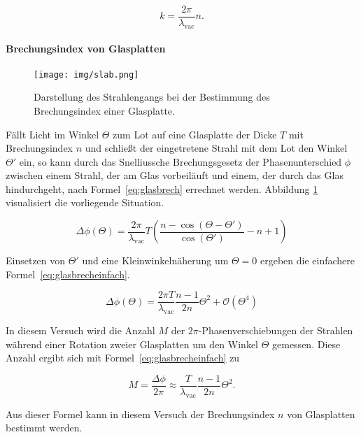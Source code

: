 \begin{equation*}
k = \frac{2\pi}{\lambda_\text{vac}}n.
\end{equation*}

\paragraph{Brechungsindex von Glasplatten}
\begin{figure}
\centering
\texttt{[image: img/slab.png]}
\caption{Darstellung des Strahlengangs bei der Bestimmung des Brechungsindex einer Glasplatte.  \cite{V64}}
\label{fig:slab}
\end{figure}

Fällt Licht im Winkel $\Theta$ zum Lot auf eine Glasplatte der Dicke $T$ mit Brechungsindex $n$ und schließt der eingetretene Strahl mit dem Lot den Winkel $\Theta'$ ein, so kann durch das Snelliussche Brechungsgesetz der Phasenunterschied $\phi$ zwischen einem Strahl, der am Glas vorbeiläuft und einem, der durch das Glas hindurchgeht, nach Formel~\eqref{eq:glasbrech} errechnet werden. Abbildung \ref{fig:slab} visualisiert die vorliegende Situation.

\begin{equation}
\Delta\phi(\Theta) = \frac{2\pi}{\lambda_\text{vac}}T\left(
\frac{n-\cos(\Theta - \Theta')}{\cos(\Theta')} - n+1\right)
\label{eq:glasbrech}
\end{equation}

Einsetzen von $\Theta'$ und eine Kleinwinkelnäherung um $\Theta = 0$ ergeben die einfachere Formel~\eqref{eq:glasbrecheinfach}.

\begin{equation}
\Delta\phi(\Theta) = \frac{2\pi T}{\lambda_\text{vac}}
\frac{n-1}{2n}\Theta^2 + \mathcal{O}(\Theta^4)
\label{eq:glasbrecheinfach}
\end{equation}

In diesem Versuch wird die Anzahl $M$ der $2\pi$-Phasenverschiebungen der Strahlen während einer Rotation zweier Glasplatten um den Winkel $\Theta$ gemessen. Diese Anzahl ergibt sich mit Formel~\eqref{eq:glasbrecheinfach} zu

\begin{equation}
M = \frac{\Delta\phi}{2\pi} \approx \frac{T}{\lambda_\text{vac}}
\frac{n-1}{2n}\Theta^2.
\label{eq:glasfringes}
\end{equation}

Aus dieser Formel kann in diesem Versuch der Brechungsindex $n$ von Glasplatten bestimmt werden.

